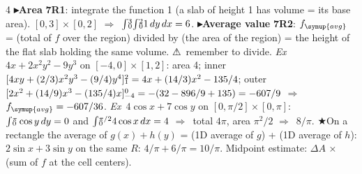 \documentclass{article}
\newcommand\supy[1]{\sp{\smash{\lower0.02em\hbox{$\scriptstyle#1$}}}}    %
\newcommand\suby[1]{\sb{\smash{\raise0.10em\hbox{$\scriptstyle#1$}}}}    %
\newcommand\I[2]{{\smash{\int}}\suby{#1}\supy{#2}}                        %
\newcommand\ev[2]{\suby{#1}\supy{#2}}                                     %
\newcommand\sh[1]{{\setlength\fboxsep{0.18pt}\colorbox{black!22}{\textbf{#1}}}}  %
\newcommand\pt[1]{\textbf{{\symf ▸}#1}}       %
\newcommand\ex{\textit{Ex}\ }                  %
\newcommand\warn{{\symf ⚠}}                    %
\newcommand\shc{{\symf ★}}                      %
\newcommand\then{\ensuremath{\Rightarrow}}
\newcommand\av{\symup{avg}}
\begin{document}
\begin{multicols*}{4}
\pt{Area} \sh{7R1}: integrate the function 1 (a slab of height 1 has volume = its base area). $[0,3]\times[0,2]$ \then\ $\I{0}{3}\I{0}{2}1\,dy\,dx=6$. \pt{Average value} \sh{7R2}: $f_\av$ = (total of $f$ over the region) divided by (the area of the region) = the height of the flat slab holding the same volume. \warn\ remember to divide. \ex $4x+2x^2y^2-9y^3$ on $[-4,0]\times[1,2]$: area 4; inner $[4xy+(2/3)x^2y^3-(9/4)y^4]\ev{1}{2}=4x+(14/3)x^2-135/4$; outer $[2x^2+(14/9)x^3-(135/4)x]\ev{-4}{0}=-(32-896/9+135)=-607/9$ \then\ $f_\av=-607/36$. \ex $4\cos x+7\cos y$ on $[0,\pi/2]\times[0,\pi]$: $\I{0}{\pi}\cos y\,dy=0$ and $\I{0}{\pi/2}4\cos x\,dx=4$ \then\ total $4\pi$, area $\pi^2/2$ \then\ $8/\pi$. \shc On a rectangle the average of $g(x)+h(y)$ = (1D average of $g$) + (1D average of $h$): $2\sin x+3\sin y$ on the same $R$: $4/\pi+6/\pi=10/\pi$. Midpoint estimate: $\Delta A$ × (sum of $f$ at the cell centers).


\end{multicols*}
\end{document}
